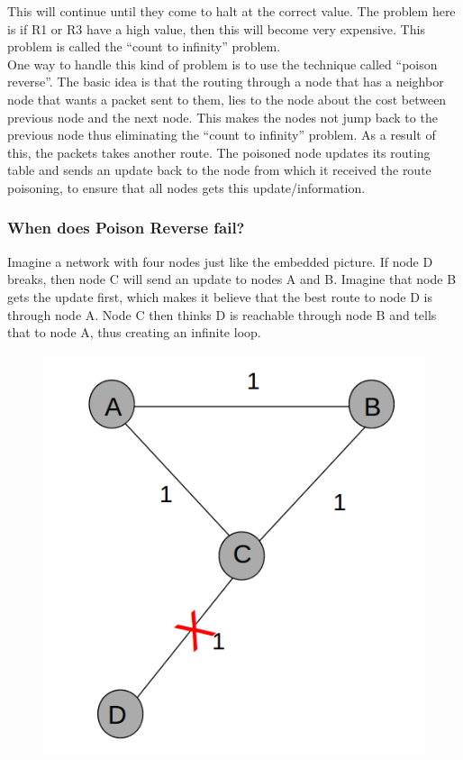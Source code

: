 \documentclass{mall}
\begin{document}
This will continue until they come to halt at the correct value. The problem here is if R1 or R3 have a high value, then this will become very expensive. This problem is called the ``count to infinity'' problem.\\

One way to handle this kind of problem is to use the technique called ``poison reverse''. The basic idea is that the routing through a node  that has a neighbor node that wants a packet sent to them, lies to the node about the cost between previous node and the next node. This makes the nodes not jump back to the previous node thus eliminating the ``count to infinity'' problem. As a result of this, the packets takes another route. The poisoned node updates its routing table and sends an update back to the node from which it received the route poisoning, to ensure that all nodes gets this update/information.
\pagebreak
\subsubsection{When does Poison Reverse fail?}
Imagine a network with four nodes just like the embedded picture. If node D breaks, then node C will send an update to nodes A and B. Imagine that node B gets the update first, which makes it believe that the best route to node D is through node A. Node C then thinks D is reachable through node B and tells that to node A, thus creating an infinite loop.

\begin{figure}[h]
	\centering
	\includegraphics[scale=0.5]{a-b-c-d.png}
\end{figure}
\end{document}

